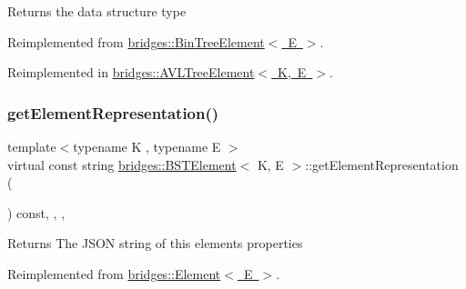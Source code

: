 \begin{DoxyReturn}{Returns}
the data structure type 
\end{DoxyReturn}


Reimplemented from \mbox{\hyperlink{classbridges_1_1_bin_tree_element_a0a154f68ef0a58715e598a6ef92b9e59}{bridges\+::\+Bin\+Tree\+Element$<$ E $>$}}.



Reimplemented in \mbox{\hyperlink{classbridges_1_1_a_v_l_tree_element_a24c005f8e07a7a2682225cead3b7e364}{bridges\+::\+A\+V\+L\+Tree\+Element$<$ K, E $>$}}.

\mbox{\label{classbridges_1_1_b_s_t_element_a623d1495a0d27090dc3fc515d148f381}} 
\subsubsection{\texorpdfstring{get\+Element\+Representation()}{getElementRepresentation()}}
{\footnotesize\ttfamily template$<$typename K , typename E $>$ \\
virtual const string \mbox{\hyperlink{classbridges_1_1_b_s_t_element}{bridges\+::\+B\+S\+T\+Element}}$<$ K, E $>$\+::get\+Element\+Representation (\begin{DoxyParamCaption}{ }\end{DoxyParamCaption}) const\hspace{0.3cm}{\ttfamily [inline]}, {\ttfamily [override]}, {\ttfamily [protected]}, {\ttfamily [virtual]}}

\begin{DoxyReturn}{Returns}
The J\+S\+ON string of this element\textquotesingle{}s properties 
\end{DoxyReturn}


Reimplemented from \mbox{\hyperlink{classbridges_1_1_element_abfea1b7226b774be648e15f6b2c9daba}{bridges\+::\+Element$<$ E $>$}}.

\mbox{\label{classbridges_1_1_b_s_t_element_ae758ef6696535dadf44eb302b923dbfd}} 
